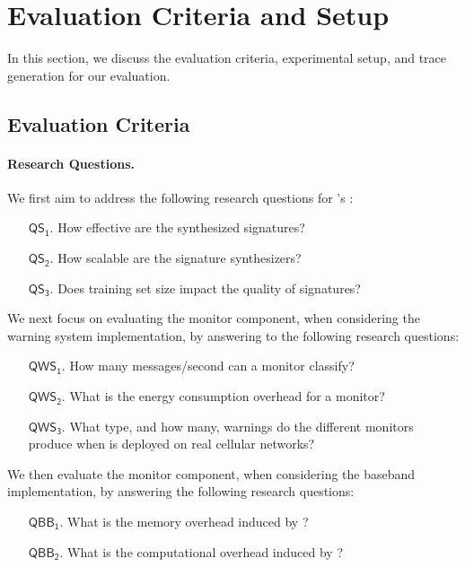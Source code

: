 \section{Evaluation Criteria and Setup}

In this section, we discuss the evaluation criteria, experimental setup, and
trace generation for our evaluation.

\subsection{Evaluation Criteria}
\label{sec:evaluation_criteria}

\paragraph{Research Questions.}
We first aim to address the following research questions
for \system{}'s \signatureSynthesizer:
%
\begin{itemize}[leftmargin=0.35in]
	\item [$\mathsf{QS_1}$.] How effective are the synthesized signatures?
	\item [$\mathsf{QS_2}$.] How scalable are the signature synthesizers?
	\item [$\mathsf{QS_3}$.] Does training set size impact the quality of signatures?
\end{itemize}

We next focus on evaluating the monitor component, when considering the warning
system implementation, by answering to the following research questions:

\begin{itemize}[leftmargin=0.49in]
	\item [$\mathsf{QWS_1}$.] How many messages/second can a monitor classify?
	\item [$\mathsf{QWS_2}$.] What is the energy consumption overhead for a monitor?
	\item [$\mathsf{QWS_3}$.] What type, and how many, warnings do the different
	monitors produce when \system is deployed on real cellular networks?
\end{itemize}

We then evaluate the monitor component, when considering the baseband implementation,
by answering the following research questions:

\begin{itemize}[leftmargin=0.46in]
	\item [$\mathsf{QBB_1}$.] What is the memory overhead induced by \system?
	\item [$\mathsf{QBB_2}$.] What is the computational overhead induced by \system?
\end{itemize}

